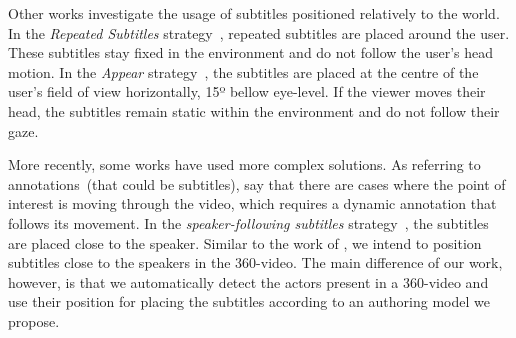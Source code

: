 Other works investigate the usage of subtitles positioned relatively to the world.
In the \emph{Repeated Subtitles} strategy~\cite{brown_subtitles_2017}, repeated subtitles are placed around the user. These subtitles stay fixed in the environment and do not follow the user's head motion.
In the \emph{Appear} strategy~\cite{brown_subtitles_2017}, the subtitles are placed at the centre of the user's field of view horizontally, 15º bellow eye-level. If the viewer moves their head, the subtitles remain static within the environment and do not follow their gaze. 

More recently, some works have used more complex solutions.
As referring to annotations~(that could be subtitles), \cite{matos_dynamic_2018} say that there are cases where the point of interest is moving through the video, which requires a dynamic annotation that follows its movement. 
In the \emph{speaker-following subtitles} strategy~\cite{rothe_dynamic_2018}, the subtitles are placed close to the speaker. 
Similar to the work of \cite{rothe_dynamic_2018}, we intend to position subtitles close to the speakers in the 360-video. The main difference of our work, however, is that we automatically detect the actors present in a 360-video and use their position for placing the subtitles according to an authoring model we propose.
  

